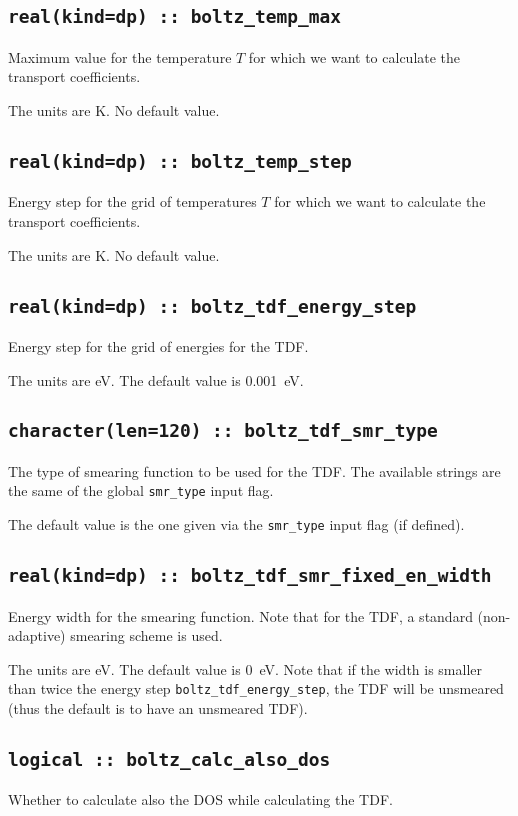 \subsection[boltz\_temp\_max]{\tt real(kind=dp) :: boltz\_temp\_max}
Maximum value for the temperature $T$ for which we want to calculate the transport coefficients.

The units are K.
No default value.

\subsection[boltz\_temp\_step]{\tt real(kind=dp) :: boltz\_temp\_step}
Energy step for the grid of temperatures $T$ for which we want to calculate the transport coefficients.

The units are K.
No default value.

\subsection[boltz\_tdf\_energy\_step]{\tt real(kind=dp) :: boltz\_tdf\_energy\_step}
Energy step for the grid of energies for the TDF.

The units are eV.
The default value is 0.001~eV.

\subsection[boltz\_tdf\_smr\_type]{\tt character(len=120) :: boltz\_tdf\_smr\_type}
The type of smearing function to be used for the TDF. The available strings are the same of the global {\tt smr\_type} input flag. 

The default value is the one given via the {\tt smr\_type} input flag (if defined).

\subsection[boltz\_tdf\_smr\_fixed\_en\_width]{\tt real(kind=dp) :: boltz\_tdf\_smr\_fixed\_en\_width}
Energy width for the smearing function. Note that for the TDF, a standard (non-adaptive) smearing scheme is used.

The units are eV.
The default value is 0~eV. Note that if the width is smaller than twice the energy step {\tt boltz\_tdf\_energy\_step}, the TDF will be unsmeared (thus the default is to have an unsmeared TDF).

\subsection[boltz\_calc\_also\_dos]{\tt logical :: boltz\_calc\_also\_dos}
Whether to calculate also the DOS while calculating the TDF.

